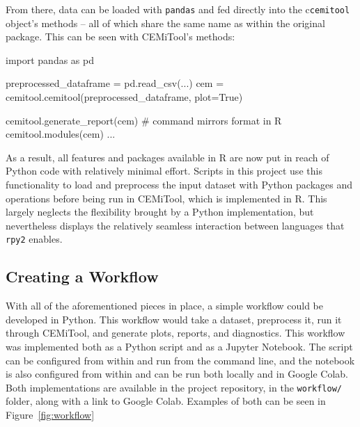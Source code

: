 \noindent From there, data can be loaded with \texttt{pandas} and fed directly into the c\texttt{cemitool} object's methods -- all of which share the same name as within the original package. This can be seen with CEMiTool's methods:

\begin{example}
  import pandas as pd

  preprocessed_dataframe = pd.read_csv(...)
  cem = cemitool.cemitool(preprocessed_dataframe, plot=True)

  cemitool.generate_report(cem) # command mirrors format in R
  cemitool.modules(cem)
  ...
\end{example}

\noindent As a result, all features and packages available in R are now put in reach of Python code with relatively minimal effort. Scripts in this project use this functionality to load and preprocess the input dataset with Python packages and operations before being run in CEMiTool, which is implemented in R. This largely neglects the flexibility brought by a Python implementation, but nevertheless displays the relatively seamless interaction between languages that \texttt{rpy2} enables. 

\subsection{Creating a Workflow}
With all of the aforementioned pieces in place, a simple workflow could be developed in Python. This workflow would take a dataset, preprocess it, run it through CEMiTool, and generate plots, reports, and diagnostics. This workflow was implemented both as a Python script and as a Jupyter Notebook. The script can be configured from within and run from the command line, and the notebook is also configured from within and can be run both locally and in Google Colab. Both implementations are available in the project repository, in the \texttt{workflow/} folder, along with a link to Google Colab. Examples of both can be seen in Figure~\ref{fig:workflow}

